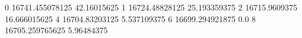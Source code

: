 0 16741.455078125 42.16015625
1 16724.48828125 25.193359375
2 16715.9609375 16.666015625
4 16704.83203125 5.537109375
6 16699.294921875 0.0
8 16705.259765625 5.96484375
